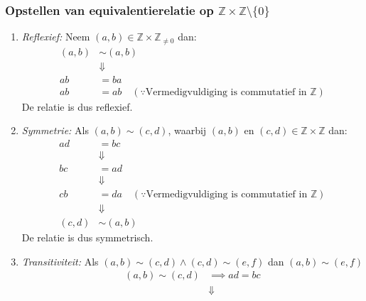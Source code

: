\documentclass{article}
\newcommand{\Z}{\mathbb{Z}}
\newcommand{\tx}[1]{\text{#1}}
\newcommand{\en}{\text{ en }}
\begin{document}
\subsubsection*{Opstellen van equivalentierelatie op $\Z \times \Z
        \setminus \{0\}$}
\begin{enumerate}[label=\arabic*]
    \item \emph{Reflexief:} Neem $(a, b) \in \Z \times \Z_{\neq 0}$ dan:
          \begin{align*}
              (a, b) & \sim (a,b)                                                         \\
                     & \Downarrow                                                         \\
              ab     & = ba                                                               \\
              ab     & = ab \quad (\because \tx{Vermedigvuldiging is commutatief in } \Z)
          \end{align*}
          De relatie is dus reflexief.
    \item \emph{Symmetrie:} Als $(a, b) \sim (c,d)$, waarbij $(a, b) \en (c, d) \in \Z \times \Z$ dan:
          \begin{align*}
              ad     & = bc                                                               \\
                     & \Downarrow                                                         \\
              bc     & = ad                                                               \\
                     & \Downarrow                                                         \\
              cb     & = da \quad (\because \tx{Vermedigvuldiging is commutatief in } \Z) \\
                     & \Downarrow                                                         \\
              (c,d ) & \sim (a,b)
          \end{align*}
          De relatie is dus symmetrisch.
    \item \emph{Transitiviteit:} Als $(a, b) \sim (c, d) \wedge (c, d) \sim (e, f)$ dan $(a, b) \sim (e, f)$
          \begin{align*}
              (a, b) \sim (c, d) & \implies ad = bc \\
                                 & \Downarrow       \\

\end{align*}
\end{enumerate}
\end{document}
